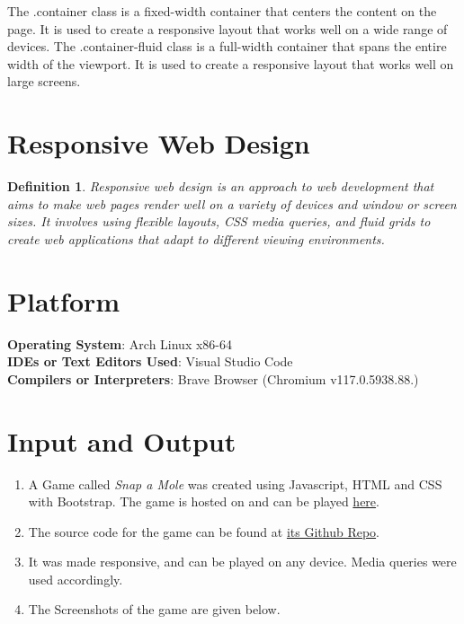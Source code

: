 \documentclass[11pt]{article}
\newtheorem{dfn}[thm]{Definition}
\begin{document}
The .container class is a fixed-width container that centers the content on the page. It is used to create a responsive layout that works well on a wide range of devices. The .container-fluid class is a full-width container that spans the entire width of the viewport. It is used to create a responsive layout that works well on large screens.

\section{Responsive Web Design}

\begin{dfn}
    Responsive web design is an approach to web development that aims to make web pages render well on a variety of devices and window or screen sizes. It involves using flexible layouts, CSS media queries, and fluid grids to create web applications that adapt to different viewing environments.
\end{dfn}

\section{Platform}
\textbf{Operating System}: Arch Linux x86-64 \\
\textbf{IDEs or Text Editors Used}: Visual Studio Code\\
\textbf{Compilers or Interpreters}: Brave Browser (Chromium v117.0.5938.88.) \\

\section{Input and Output}

\begin{enumerate}
    \item A Game called \textit{Snap a Mole} was created using Javascript, HTML and CSS with Bootstrap. The game is hosted on and can be played \href{https://snap-a-mole.surge.sh/}{here}.
    \item The source code for the game can be found at \href{https://github.com/KrishnarajT/Snap-A-Mole}{its Github Repo}.
    \item It was made responsive, and can be played on any device. Media queries were used accordingly.
    \item The Screenshots of the game are given below.
\end{enumerate}
\end{document}
